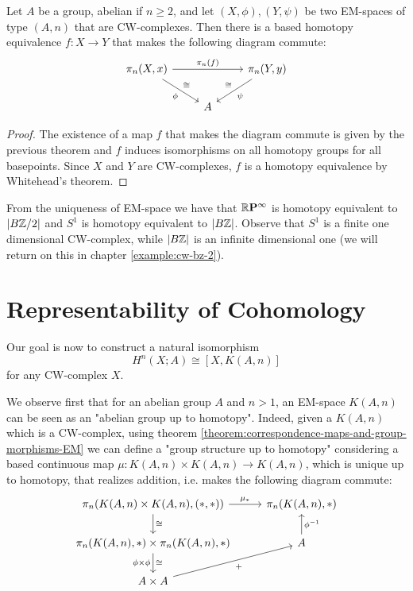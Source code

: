 \begin{corollary}
Let $A$ be a group, abelian if $n\ge2$, and let $(X,\phi), (Y,\psi)$ be two EM-spaces of type $(A,n)$ that are CW-complexes. Then there is a based homotopy equivalence $f:X\to Y$ that makes the following diagram commute:
\[
\begin{tikzcd}
\pi_n(X,x) \ar[dr,"\phi"',"\cong"] \ar[rr,"\pi_n(f)"] & & \pi_n(Y,y) \ar[dl,"\psi","\cong"']\\
& A &
\end{tikzcd}
\]
\end{corollary}

\begin{proof}
The existence of a map $f$ that makes the diagram commute is given by the previous theorem and $f$ induces isomorphisms on all homotopy groups for all basepoints. Since $X$ and $Y$ are CW-complexes, $f$ is a homotopy equivalence by Whitehead's theorem.
\end{proof}

\begin{example}
From the uniqueness of EM-space we have that ${{\mathbb R}\mathbf{P}^{\infty}}$ is homotopy equivalent to $|B{\mathbb Z}/2|$ and $S^1$ is homotopy equivalent to $|B{\mathbb Z}|$. Observe that $S^1$ is a finite one dimensional CW-complex, while $|B{\mathbb Z}|$ is an infinite dimensional one (we will return on this in chapter \ref{example:cw-bz-2}).
\end{example}\label{example:cw-bz-1}

\section{Representability of Cohomology}

Our goal is now to construct a natural isomorphism
\[H^n(X;A)\cong[X,K(A,n)]\]
for any CW-complex $X$.

We observe first that for an abelian group $A$ and $n>1$, an EM-space $K(A,n)$ can be seen as an "abelian group up to homotopy". Indeed, given a $K(A,n)$ which is a CW-complex, using theorem \ref{theorem:correspondence-maps-and-group-morphisms-EM} we can define a "group structure up to homotopy" considering a based continuous map $\mu:K(A,n)\times K(A,n)\to K(A,n)$, which is unique up to homotopy, that realizes addition, i.e. makes the following diagram commute:
\[
\begin{tikzcd}
\pi_n(K(A,n)\times K(A,n),(*,*)) \ar[d,"\cong"] \ar[r,"\mu_*"] & \pi_n(K(A,n),*)\\
\pi_n(K(A,n),*)\times \pi_n(K(A,n),*) \ar[d,"\phi\times\phi"',"\cong"] & A \ar[u,"\phi^\inv"']\\
A\times A \ar[ur,"+"'] &
\end{tikzcd}
\]

